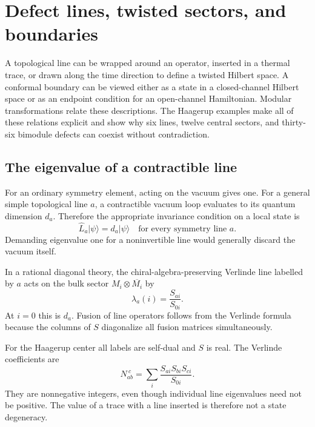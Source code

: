 \chapter{Defect lines, twisted sectors, and boundaries}
\label{ch:defects}

A topological line can be wrapped around an operator, inserted in
a thermal trace, or drawn along the time direction to define a
twisted Hilbert space. A conformal boundary can be viewed either
as a state in a closed-channel Hilbert space or as an endpoint
condition for an open-channel Hamiltonian. Modular transformations
relate these descriptions. The Haagerup examples make all of these
relations explicit and show why six lines, twelve central sectors,
and thirty-six bimodule defects can coexist without contradiction.

\section{The eigenvalue of a contractible line}

For an ordinary symmetry element, acting on the vacuum gives one.
For a general simple topological line $a$, a contractible vacuum
loop evaluates to its quantum dimension $d_a$. Therefore the
appropriate invariance condition on a local state is
\begin{equation}
 \widehat L_a|\psi\rangle=d_a|\psi\rangle
 \quad\text{for every symmetry line }a.
 \label{eq:defect-invariant}
\end{equation}
Demanding eigenvalue one for a noninvertible line would generally
discard the vacuum itself.

In a rational diagonal theory, the chiral-algebra-preserving
Verlinde line labelled by $a$ acts on the bulk sector
$M_i\otimes\overline{M_i}$ by
\begin{equation}
 \lambda_a(i)=\frac{S_{ai}}{S_{0i}}.
 \label{eq:defect-eigenvalue}
\end{equation}
At $i=0$ this is $d_a$. Fusion of line operators follows from
the Verlinde formula because the columns of $S$ diagonalize all
fusion matrices simultaneously.

For the Haagerup center all labels are self-dual and $S$ is real.
The Verlinde coefficients are
\begin{equation}
 N_{ab}^{\ c}=\sum_i\frac{S_{ai}S_{bi}S_{ci}}{S_{0i}}.
 \label{eq:defect-Verlinde}
\end{equation}
They are nonnegative integers, even though individual line
eigenvalues need not be positive. The value of a trace with a
line inserted is therefore not a state degeneracy.

